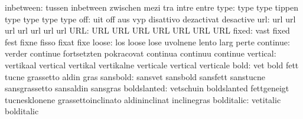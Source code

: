                 inbetween: tussen                    inbetween
                           zwischen                  mezi
                           tra                       intre
                           entre
                     type: type                      type
                           tippen                    type
                           type                      type
                           type
                      off: uit                       off
                           aus                       vyp
                           disattivo                 dezactivat
                           desactive
                      url: url                       url
                           url                       url
                           url                       url
                           url
                      URL: URL                       URL
                           URL                       URL
                           URL                       URL
                           URL
                    fixed: vast                      fixed
                           fest                      fixne
                           fisso                     fixat
                           fixe
                    loose: los                       loose
                           lose                      uvolnene
                           lento                     larg
                           perte
                 continue: verder                    continue
                           fortsetzten               pokracovat
                           continua                  continuu
                           continue
                 vertical: vertikaal                 vertical
                           vertikal                  vertikalne
                           verticale                 vertical
                           verticale
                     bold: vet                       bold
                           fett                      tucne
                           grassetto                 aldin
                           gras
                 sansbold: sansvet                   sansbold
                           sansfett                  sanstucne
                           sansgrassetto             sansaldin
                           sansgras
              boldslanted: vetschuin                 boldslanted
                           fettgeneigt               tucnesklonene
                           grassettoinclinato        aldininclinat
                           inclinegras
               bolditalic: vetitalic                 bolditalic
